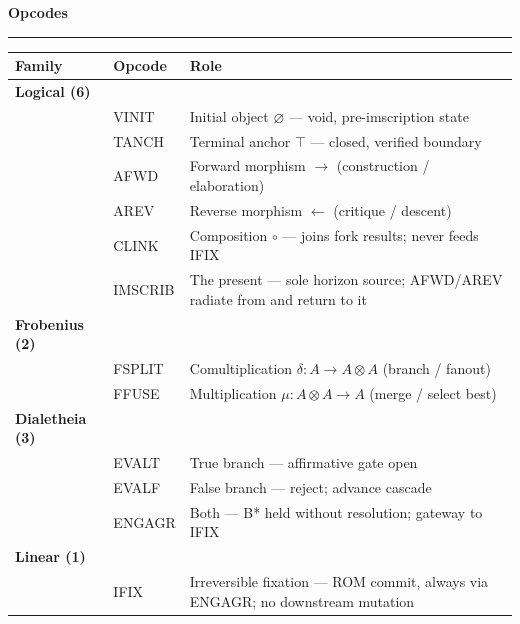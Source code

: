 \documentclass[10pt]{article}
\newcommand{\shead}[1]{%
  {\large\bfseries\color{shead} #1}%
  \\[-2pt]{\color{hrule}\rule{\linewidth}{0.5pt}}\par\vspace{4pt}}
\begin{document}
\begin{minipage}[t]{0.382\textwidth}

\shead{Opcodes}

\renewcommand{\arraystretch}{1.28}
\setlength{\tabcolsep}{6pt}
\begin{tabularx}{\linewidth}{%
  @{}>{\small\color{dim}}l%
  >{\ttfamily\normalsize}l%
  >{\small\raggedright\arraybackslash}X@{}}
\toprule
\rowcolor{thead}
\small Family & \small Opcode & \small Role \\
\midrule
\rowcolor{fl}
\multicolumn{3}{@{}l@{}}%
  {\hspace{4pt}\color{logical}\normalsize\bfseries Logical \color{dim}\small(6)}\\[-1pt]
\rowcolor{fl}
& {\color{logical}VINIT}
  & Initial object $\varnothing$ — void, pre-imscription state\\
\rowcolor{fl}
& {\color{logical}TANCH}
  & Terminal anchor $\top$ — closed, verified boundary\\
\rowcolor{fl}
& {\color{logical}AFWD}
  & Forward morphism $\to$ (construction / elaboration)\\
\rowcolor{fl}
& {\color{logical}AREV}
  & Reverse morphism $\leftarrow$ (critique / descent)\\
\rowcolor{fl}
& {\color{logical}CLINK}
  & Composition $\circ$ — joins fork results;
    {\color{dial}never feeds {\ttfamily IFIX}}\\
\rowcolor{fl}
& {\color{logical}IMSCRIB}
  & The present — sole horizon source;
    {\ttfamily AFWD}/{\ttfamily AREV} radiate from and return to it\\
\addlinespace[3pt]
\rowcolor{ff}
\multicolumn{3}{@{}l@{}}%
  {\hspace{4pt}\color{frob}\normalsize\bfseries Frobenius \color{dim}\small(2)}\\[-1pt]
\rowcolor{ff}
& {\color{frob}FSPLIT}
  & Comultiplication $\delta\colon A \to A\!\otimes\!A$ (branch / fanout)\\
\rowcolor{ff}
& {\color{frob}FFUSE}
  & Multiplication $\mu\colon A\!\otimes\!A \to A$ (merge / select best)\\
\addlinespace[3pt]
\rowcolor{fd}
\multicolumn{3}{@{}l@{}}%
  {\hspace{4pt}\color{dial}\normalsize\bfseries Dialetheia \color{dim}\small(3)}\\[-1pt]
\rowcolor{fd}
& {\color{dial}EVALT}  & True branch — affirmative gate open\\
\rowcolor{fd}
& {\color{dial}EVALF}  & False branch — reject; advance cascade\\
\rowcolor{fd}
& {\color{dial}ENGAGR}
  & Both — B* held without resolution;
    gateway to {\color{lin}\ttfamily IFIX}\\
\addlinespace[3pt]
\rowcolor{fx}
\multicolumn{3}{@{}l@{}}%
  {\hspace{4pt}\color{lin}\normalsize\bfseries Linear \color{dim}\small(1)}\\[-1pt]
\rowcolor{fx}
& {\color{lin}IFIX}
  & Irreversible fixation — ROM commit,
    always via {\color{dial}\ttfamily ENGAGR};
    no downstream mutation\\
\bottomrule
\end{tabularx}

\end{minipage}%
\end{document}
